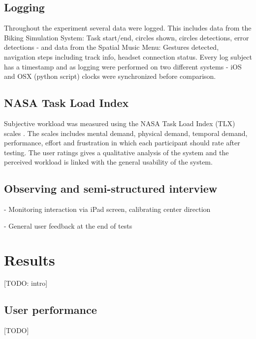 \subsection{Logging}
Throughout the experiment several data were logged. This includes data from the Biking Simulation System: Task start/end, circles shown, circles detections, error detections - and data from the Spatial Music Menu: Gestures detected, navigation steps including track info, headset connection status. Every log subject has a timestamp and as logging were performed on two different systems - iOS and OSX (python script) clocks were synchronized before comparison.


\subsection{NASA Task Load Index}
Subjective workload was measured using the NASA Task Load Index (TLX) scales \cite{hart_workload_1990}. The scales includes mental demand, physical demand, temporal demand, performance, effort and frustration in which each participant should rate after testing. The user ratings gives a qualitative analysis of the system and the perceived workload is linked with the general usability of the system.

\subsection{Observing and semi-structured interview}

- Monitoring interaction via iPad screen, calibrating center direction

- General user feedback at the end of tests


\section{Results}
[TODO: intro]

\subsection{User performance}
[TODO]

